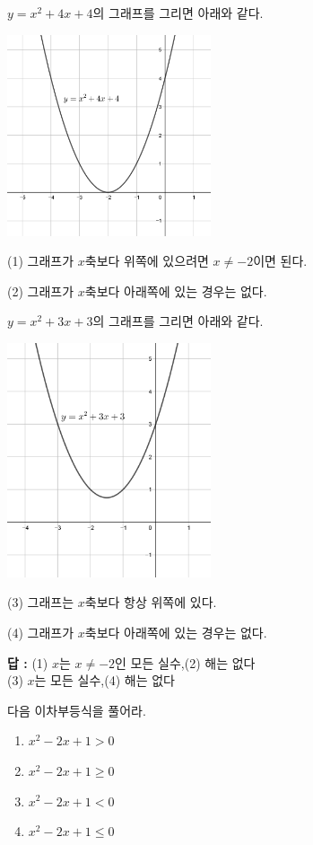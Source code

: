 \documentclass{oblivoir}
\begin{document}
\begin{mdframed}[frametitle=풀이2]
\(y=x^2+4x+4\)의 그래프를 그리면 아래와 같다.
\begin{center}
\includegraphics[width=0.45\textwidth]{y=x^2-4x+4}
\end{center}

(1)
그래프가 \(x\)축보다 위쪽에 있으려면 \(x\neq-2\)이면 된다.

(2)
그래프가 \(x\)축보다 아래쪽에 있는 경우는 없다.

\bigskip\noindent
\(y=x^2+3x+3\)의 그래프를 그리면 아래와 같다.
\begin{center}
\includegraphics[width=0.45\textwidth]{y=x^2+3x+3}
\end{center}

(3)
그래프는 \(x\)축보다 항상 위쪽에 있다.

(4)
그래프가 \(x\)축보다 아래쪽에 있는 경우는 없다.
\end{mdframed}
{\par\raggedleft\textbf{답 : }
(1) \(x\)는 \(x\neq-2\)인 모든 실수,\quad (2) 해는 없다\\
(3) \(x\)는 모든 실수,\quad (4) 해는 없다
\par}

\clearpage
%
\prob{}\label{ineq2}
다음 이차부등식을 풀어라.
\begin{enumerate}
\item
\(x^2-2x+1>0\)
\item
\(x^2-2x+1\ge0\)
\item
\(x^2-2x+1<0\)
\item
\(x^2-2x+1\le0\)
\end{enumerate}
\begin{mdframed}[frametitle=풀이1]
\vspace{0.3\textheight}
\end{mdframed}
\begin{mdframed}[frametitle=풀이2]
\vspace{0.3\textheight}
\end{mdframed}
\end{document}
